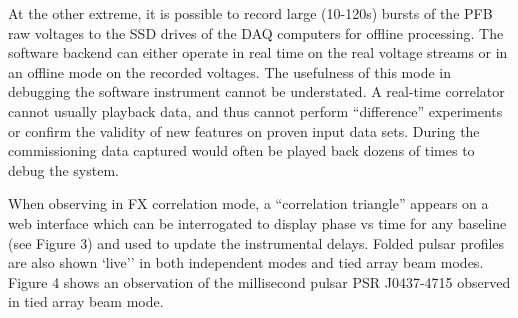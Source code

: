 
At the other extreme, it is possible to record large (10-120s) bursts of the PFB raw voltages to the SSD drives of the DAQ computers for offline processing. The software backend can either operate in real time on the real voltage streams or in an offline mode on the recorded voltages. The usefulness of this mode in debugging the software instrument cannot be understated. A real-time correlator cannot usually playback data, and thus cannot perform ``difference'' experiments or confirm the validity of new features on proven input data sets. During the commissioning data captured would often be played back dozens of times to debug the system.

When observing in FX correlation mode, a ``correlation triangle'' appears on a web interface which can be interrogated to display phase vs time for any baseline (see Figure 3) and used to update the instrumental delays.
Folded pulsar profiles are also shown `live'' in both independent modes and tied array beam modes. Figure 4 shows an observation of the millisecond pulsar PSR J0437-4715 observed in tied array beam mode.